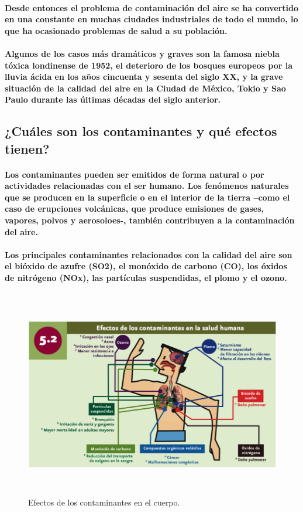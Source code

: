     \paragraph {Desde entonces el problema de contaminación del aire se ha convertido en una constante en muchas ciudades industriales de todo el mundo, lo que ha ocasionado problemas de salud a su población.}

    \paragraph {Algunos de los casos más dramáticos y graves son la famosa niebla tóxica londinense de 1952, el deterioro de los bosques europeos por la lluvia ácida en los años cincuenta y sesenta del siglo XX, y la grave situación de la calidad del aire en la Ciudad de México, Tokio y Sao Paulo durante las últimas décadas del siglo anterior. }

    \subsection {¿Cuáles son los contaminantes y qué efectos tienen?}
    \paragraph {Los contaminantes pueden ser emitidos de forma natural o por actividades relacionadas con el ser humano. Los fenómenos naturales que se producen en la superficie o  en el interior de la tierra –como el caso de erupciones volcánicas, que produce emisiones de gases, vapores, polvos y aerosoloes-, también contribuyen a la contaminación del aire.}
      
    \paragraph {Los principales contaminantes relacionados con la calidad del aire son el bióxido de azufre (SO2), el monóxido de carbono (CO), los óxidos  de nitrógeno (NOx), las partículas suspendidas, el plomo y el ozono.}
    
  	\begin{figure}[h!]
	  	\centering
  	      \includegraphics[width=12.5cm,height=9cm]{./images/1.png}
  	    \caption{Efectos de los contaminantes en el cuerpo.}
	\end{figure}

